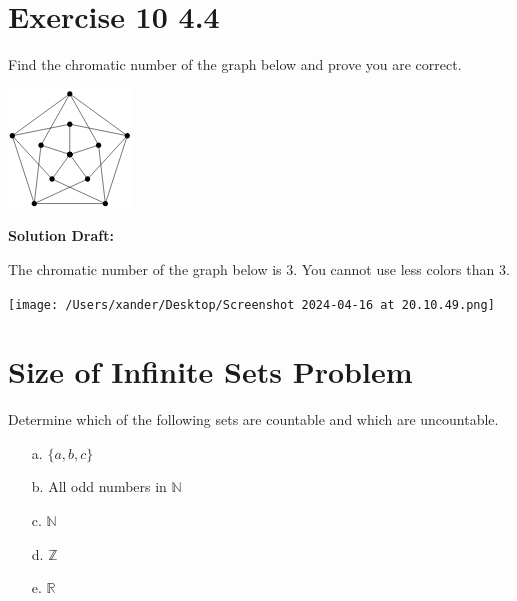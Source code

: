 \documentclass{article}
\begin{document}
\section*{Exercise 10 4.4}  

Find the chromatic number of the graph below and prove you are correct.

\begin{center}
    \includegraphics[width=0.8\linewidth]{Capture-2024-04-16-200146.png} %
\end{center}


\vspace{0.5cm}
\noindent\textbf{Solution Draft:} 
\vspace{0.2cm}

The chromatic number of the graph below is 3. You cannot use less colors than 3.

\begin{center}
    \texttt{[image: /Users/xander/Desktop/Screenshot 2024-04-16 at 20.10.49.png]} %
\end{center}


\section*{Size of Infinite Sets Problem}  

Determine which of the following sets are countable and which are uncountable.
\begin{enumerate}
    \item[a.] $\{a, b, c\}$
    \item[b.] All odd numbers in $\mathbb{N}$
    \item[c.] $\mathbb{N}$
    \item[d.] $\mathbb{Z}$
    \item[e.] $\mathbb{R}$
\end{enumerate}
\end{document}
